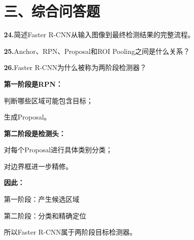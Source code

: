 \documentclass[UTF8,openany,oneside,zihao=-4,fontset=windows]{ctexbook}
\newif\ifshowsolutions
\newcommand{\Question}[2]{%
  \par\Needspace{4\baselineskip}\medskip
  \noindent\textbf{\color{MVBlue}#1}\quad #2\par
}
\newenvironment{AnswerBox}{\begin{tcolorbox}[breakable,colback=MVLight,colframe=MVBlue!45,title={参考答案},fonttitle=\bfseries,boxrule=0.55pt,arc=1.5mm,left=2mm,right=2mm,top=1.5mm,bottom=1.5mm]}{\end{tcolorbox}}
\newcommand{\PracticeSpace}[1]{\ifshowsolutions\else\par\vspace{#1}\par\fi}
\begin{document}
\section{三、综合问答题}
\Question{24.}{简述Faster R-CNN从输入图像到最终检测结果的完整流程。}
\ifshowsolutions
\begin{AnswerBox}
\par\noindent\textbullet\quad 输入图像经过主干卷积网络，得到共享特征图；
\par\noindent\textbullet\quad RPN在共享特征图的每个位置设置多个Anchor；
\par\noindent\textbullet\quad RPN对Anchor进行前景、背景分类和边界框回归；
\par\noindent\textbullet\quad 将调整后的候选框进行裁剪、筛选和NMS，得到Proposal；
\par\noindent\textbullet\quad 将Proposal映射到共享特征图；
\par\noindent\textbullet\quad 使用ROI Pooling将不同大小的ROI转换为固定大小特征；
\par\noindent\textbullet\quad 检测头对每个ROI进行目标类别分类；
\par\noindent\textbullet\quad 检测头进一步进行边界框回归；
\par 使用置信度筛选和NMS得到最终检测结果。
\end{AnswerBox}
\else
\PracticeSpace{2.4cm}
\fi
\Question{25.}{Anchor、RPN、Proposal和ROI Pooling之间是什么关系？}
\ifshowsolutions
\begin{AnswerBox}
\par\noindent\textbf{它们之间的关系为：}
\par 特征图每个位置生成Anchor
\par → RPN判断前景/背景并预测坐标偏移
\par → Anchor经过回归和NMS形成Proposal
\par → Proposal映射到共享特征图成为ROI
\par → ROI Pooling提取固定大小特征
\par → 分类与边界框精修
\par Anchor是初始参考框，RPN负责筛选和调整Anchor，Proposal是RPN输出的候选框，ROI Pooling负责提取固定尺寸的候选区域特征。
\end{AnswerBox}
\else
\PracticeSpace{2.4cm}
\fi
\Question{26.}{Faster R-CNN为什么被称为两阶段检测器？}
\ifshowsolutions
\begin{AnswerBox}
\par\noindent\textbf{第一阶段是RPN：}
\par\noindent\textbullet\quad 判断哪些区域可能包含目标；
\par 生成Proposal。
\par\noindent\textbf{第二阶段是检测头：}
\par\noindent\textbullet\quad 对每个Proposal进行具体类别分类；
\par 对边界框进一步精修。
\par\noindent\textbf{因此：}
\par 第一阶段：产生候选区域
\par 第二阶段：分类和精确定位
\par 所以Faster R-CNN属于两阶段目标检测器。
\end{AnswerBox}
\end{document}

